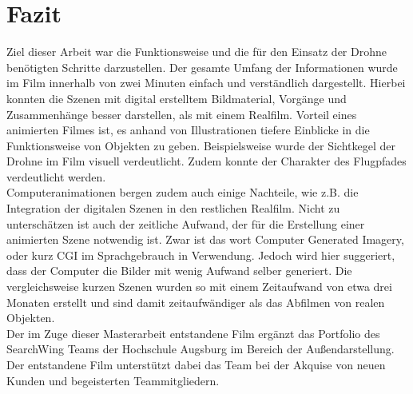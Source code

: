 \chapter{Fazit}

Ziel dieser Arbeit war die Funktionsweise und die für den Einsatz der Drohne benötigten Schritte darzustellen. Der gesamte Umfang der Informationen wurde im Film innerhalb von zwei Minuten einfach und verständlich dargestellt. Hierbei konnten die Szenen mit digital erstelltem Bildmaterial, Vorgänge und Zusammenhänge besser darstellen, als mit einem Realfilm. Vorteil eines animierten Filmes ist, es anhand von Illustrationen tiefere Einblicke in die Funktionsweise von Objekten zu geben. Beispielsweise wurde der Sichtkegel der Drohne im Film visuell verdeutlicht. Zudem konnte der Charakter des Flugpfades verdeutlicht werden.\\
Computeranimationen bergen zudem auch einige Nachteile, wie z.B. die Integration der digitalen Szenen in den restlichen Realfilm. Nicht zu unterschätzen ist auch der zeitliche Aufwand, der für die Erstellung einer animierten Szene notwendig ist. Zwar ist das wort Computer Generated Imagery, oder kurz CGI im Sprachgebrauch in Verwendung. Jedoch wird hier suggeriert, dass der Computer die Bilder mit wenig Aufwand selber generiert. Die vergleichsweise kurzen Szenen wurden so mit einem Zeitaufwand von etwa drei Monaten erstellt und sind damit zeitaufwändiger als das Abfilmen von realen Objekten.\\

Der im Zuge dieser Masterarbeit entstandene Film ergänzt das Portfolio des SearchWing Teams der Hochschule Augsburg im Bereich der Außendarstellung.
Der entstandene Film unterstützt dabei das Team bei der Akquise von neuen Kunden und begeisterten Teammitgliedern.